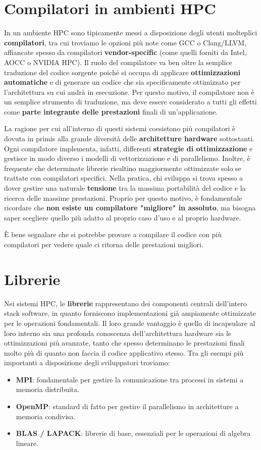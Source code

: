 \section{Compilatori in ambienti HPC}
In un ambiente HPC sono tipicamente messi a disposizione degli utenti molteplici \textbf{compilatori}, tra cui troviamo le opzioni più note come GCC o Clang/LLVM, affiancate spesso da compilatori \textbf{vendor-specific} (come quelli forniti da Intel, AOCC o NVIDIA HPC). Il ruolo del compilatore va ben oltre la semplice traduzione del codice sorgente poiché si occupa di applicare \textbf{ottimizzazioni automatiche} e di generare un codice che sia specificamente ottimizzato per l'architettura su cui andrà in esecuzione. Per questo motivo, il compilatore non è un semplice strumento di traduzione, ma deve essere considerato a tutti gli effetti come \textbf{parte integrante delle prestazioni} finali di un'applicazione.

La ragione per cui all'interno di questi sistemi coesistono più compilatori è dovuta in primis alla grande diversità delle \textbf{architetture hardware} sottostanti. Ogni compilatore implementa, infatti, differenti \textbf{strategie di ottimizzazione} e gestisce in modo diverso i modelli di vettorizzazione e di parallelismo. Inoltre, è frequente che determinate librerie risultino maggiormente ottimizzate solo se trattate con compilatori specifici. 
Nella pratica, chi sviluppa si trova spesso a dover gestire una naturale \textbf{tensione} tra la massima portabilità del codice e la ricerca delle massime prestazioni. Proprio per questo motivo, è fondamentale ricordare che \textbf{non esiste un compilatore "migliore" in assoluto}, ma bisogna saper scegliere quello più adatto al proprio caso d'uso e al proprio hardware.

È bene segnalare che si potrebbe provare a compilare il codice con più compilatori per vedere quale ci ritorna delle prestazioni migliori.
\section{Librerie}
Nei sistemi HPC, le \textbf{librerie} rappresentano dei componenti centrali dell'intero stack software, in quanto forniscono implementazioni già ampiamente ottimizzate per le operazioni fondamentali. Il loro grande vantaggio è quello di incapsulare al loro interno sia una profonda conoscenza dell'architettura hardware sia le ottimizzazioni più avanzate, tanto che spesso determinano le prestazioni finali molto più di quanto non faccia il codice applicativo stesso. Tra gli esempi più importanti a disposizione degli sviluppatori troviamo:
\begin{itemize}
    \item \textbf{MPI}: fondamentale per gestire la comunicazione tra processi in sistemi a memoria distribuita.
    \item \textbf{OpenMP}: standard di fatto per gestire il parallelismo in architetture a memoria condivisa.
    \item \textbf{BLAS / LAPACK}: librerie di base, essenziali per le operazioni di algebra lineare.
\end{itemize}

